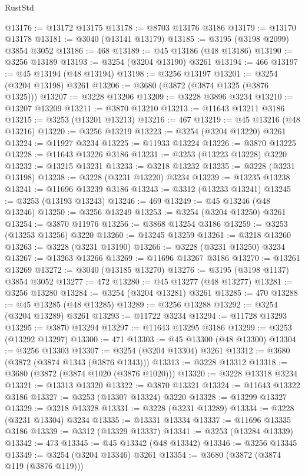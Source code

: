 \begin{lexlean}{RustStd}
\begin{coremodule}
@13176 := @13172 @13175
@13178 := @8703 @13176 @3186
@13179 := @13170 @13178
@13181 := @3040 (@13141 @13179)
@13185 := @3195 (@3198 @2099) @3854 @3052
@13186 := 468
@13189 := @45 @13186 (@48 @13186)
@13190 := @3256 @13189
@13193 := @3254 (@3204 @13190) @3261
@13194 := 466
@13197 := @45 @13194 (@48 @13194)
@13198 := @3256 @13197
@13201 := @3254 (@3204 @13198) @3261
@13206 := @3680 (@3872 (@3874 @1325 (@3876 @1325)))
@13207 := @3228 @13206
@13209 := @3228 @3896 @3234
@13210 := @13207 @13209
@13211 := @3870 @13210
@13213 := @11643 @13211 @3186
@13215 := @3253 (@13201 @13213)
@13216 := 467
@13219 := @45 @13216 (@48 @13216)
@13220 := @3256 @13219
@13223 := @3254 (@3204 @13220) @3261
@13224 := @11927 @3234
@13225 := @11933 @13224
@13226 := @3870 @13225
@13228 := @11643 @13226 @3186
@13231 := @3253 (@13223 @13228) @3220
@13232 := @13215 @13231
@13233 := @3218 @13232
@13235 := @3228 (@3231 @13198)
@13238 := @3228 (@3231 @13220) @3234
@13239 := @13235 @13238
@13241 := @11696 @13239 @3186
@13243 := @3312 (@13233 @13241)
@13245 := @3253 (@13193 @13243)
@13246 := 469
@13249 := @45 @13246 (@48 @13246)
@13250 := @3256 @13249
@13253 := @3254 (@3204 @13250) @3261
@13254 := @3870 @11976
@13256 := @3868 @13254 @3186
@13259 := @3253 (@13253 @13256) @3220
@13260 := @13245 @13259
@13261 := @3218 @13260
@13263 := @3228 (@3231 @13190)
@13266 := @3228 (@3231 @13250) @3234
@13267 := @13263 @13266
@13269 := @11696 @13267 @3186
@13270 := @13261 @13269
@13272 := @3040 (@13185 @13270)
@13276 := @3195 (@3198 @1137) @3854 @3052
@13277 := 472
@13280 := @45 @13277 (@48 @13277)
@13281 := @3256 @13280
@13284 := @3254 (@3204 @13281) @3261
@13285 := 470
@13288 := @45 @13285 (@48 @13285)
@13289 := @3256 @13288
@13292 := @3254 (@3204 @13289) @3261
@13293 := @11722 @3234
@13294 := @11728 @13293
@13295 := @3870 @13294
@13297 := @11643 @13295 @3186
@13299 := @3253 (@13292 @13297)
@13300 := 471
@13303 := @45 @13300 (@48 @13300)
@13304 := @3256 @13303
@13307 := @3254 (@3204 @13304) @3261
@13312 := @3680 (@3872 (@3874 @1343 (@3876 @1343)))
@13313 := @3228 @13312
@13318 := @3680 (@3872 (@3874 @1020 (@3876 @1020)))
@13320 := @3228 @13318 @3234
@13321 := @13313 @13320
@13322 := @3870 @13321
@13324 := @11643 @13322 @3186
@13327 := @3253 (@13307 @13324) @3220
@13328 := @13299 @13327
@13329 := @3218 @13328
@13331 := @3228 (@3231 @13289)
@13334 := @3228 (@3231 @13304) @3234
@13335 := @13331 @13334
@13337 := @11696 @13335 @3186
@13339 := @3312 (@13329 @13337)
@13341 := @3253 (@13284 @13339)
@13342 := 473
@13345 := @45 @13342 (@48 @13342)
@13346 := @3256 @13345
@13349 := @3254 (@3204 @13346) @3261
@13354 := @3680 (@3872 (@3874 @119 (@3876 @119)))

\end{coremodule}
\end{lexlean}
